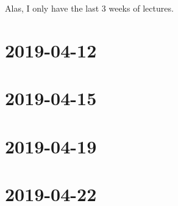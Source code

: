 \documentclass{ccg-notes}
\author{Colton~Grainger}
\date{\today}
\begin{document}
\frontstuff

Alas, I only have the last 3 weeks of lectures.

\section{2019-04-12}
    

\section{2019-04-15}
    

%     

\section{2019-04-19}
    

\section{2019-04-22}
    
\end{document}
